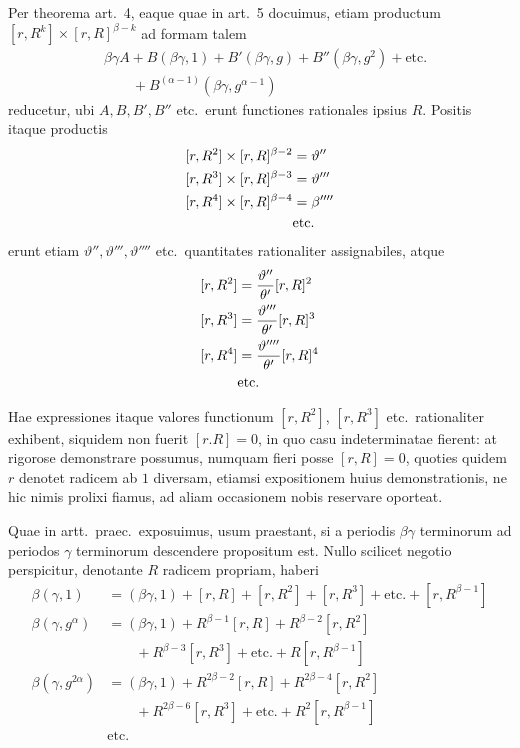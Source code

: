 Per theorema art.\ 4, eaque quae in art.\ 5 docuimus, etiam productum $[r,R^k]\times[r,R]^{\beta-k}$ ad formam talem
\[
\begin{aligned}
&\beta\gamma A+B(\beta\gamma,1)+B'(\beta\gamma,g)+B''(\beta\gamma,g^2)+\text{etc.}\\
&\qquad{}+B^{(\alpha-1)}(\beta\gamma,g^{\alpha-1})
\end{aligned}
\]
reducetur, ubi $A,B,B',B''$ etc.\ erunt functiones rationales ipsius $R$. Positis itaque productis
\[
\begin{aligned}
[r,R^2]\times[r,R]^{\beta-2}&=\vartheta''\\
\relax[r,R^3]\times[r,R]^{\beta-3}&=\vartheta'''\\
\relax[r,R^4]\times[r,R]^{\beta-4}&=\beta''''\\
&\text{etc.}
\end{aligned}
\]
erunt etiam $\vartheta'',\vartheta''',\vartheta''''$ etc.\ quantitates rationaliter assignabiles, atque
%
\[
\begin{aligned}
[r,R^2]&=\frac{\vartheta''}{\theta'}[r,R]^2\\
\relax[r,R^3]&=\frac{\vartheta'''}{\theta'}[r,R]^3\\
\relax[r,R^4]&=\frac{\vartheta''''}{\theta'}[r,R]^4\\
&\text{etc.}
\end{aligned}
\]

Hae expressiones itaque valores functionum $[r,R^2]$, $[r,R^3]$ etc.\ rationaliter exhibent, siquidem non fuerit $[r.R]=0$, in quo casu indeterminatae fierent: at rigorose demonstrare possumus, numquam fieri posse $[r,R]=0$, quoties quidem $r$ denotet radicem ab $1$ diversam, etiamsi expositionem huius demonstrationis, ne hic nimis prolixi fiamus, ad aliam occasionem nobis reservare oporteat.

Quae in artt.\ praec.\ exposuimus, usum praestant, si a periodis $\beta\gamma$ terminorum ad periodos $\gamma$ terminorum descendere propositum est. Nullo scilicet negotio perspicitur, denotante $R$ radicem propriam, haberi
\[
\begin{aligned}
\beta(\gamma,1)&=(\beta\gamma,1)+[r,R]+[r,R^2]+[r,R^3]+\text{etc.}+[r,R^{\beta-1}]\\
\beta(\gamma,g^\alpha)&=(\beta\gamma,1)+R^{\beta-1}[r,R]+R^{\beta-2}[r,R^2]\\
&\qquad{}+R^{\beta-3}[r,R^3]+\text{etc.}+R[r,R^{\beta-1}]\\
\beta(\gamma,g^{2\alpha})&=(\beta\gamma,1)+R^{2\beta-2}[r,R]+R^{2\beta-4}[r,R^2]\\
&\qquad{}+R^{2\beta-6}[r,R^3]+\text{etc.}+R^2[r,R^{\beta-1}]\\
&\text{etc.}
\end{aligned}
\]

